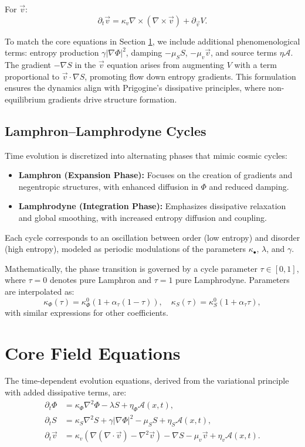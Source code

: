 \documentclass[12pt]{article}
\theoremstyle{definition}
\begin{document}
For $\vec{v}$:
\[
\partial_t \vec{v} = \kappa_v \nabla \times (\nabla \times \vec{v}) + \partial_{\vec{v}} V.
\]

To match the core equations in Section \ref{sec:core-equations}, we include additional phenomenological terms: entropy production $\gamma |\nabla \Phi|^2$, damping $-\mu_S S$, $-\mu_v \vec{v}$, and source terms $\eta \mathcal{A}$. The gradient $-\nabla S$ in the $\vec{v}$ equation arises from augmenting $V$ with a term proportional to $\vec{v} \cdot \nabla S$, promoting flow down entropy gradients. This formulation ensures the dynamics align with Prigogine's dissipative principles, where non-equilibrium gradients drive structure formation.

\subsection{Lamphron–Lamphrodyne Cycles}
Time evolution is discretized into alternating phases that mimic cosmic cycles:
\begin{itemize}
  \item \textbf{Lamphron (Expansion Phase):} Focuses on the creation of gradients and negentropic structures, with enhanced diffusion in $\Phi$ and reduced damping.
  \item \textbf{Lamphrodyne (Integration Phase):} Emphasizes dissipative relaxation and global smoothing, with increased entropy diffusion and coupling.
\end{itemize}
Each cycle corresponds to an oscillation between order (low entropy) and disorder (high entropy), modeled as periodic modulations of the parameters $\kappa_\bullet$, $\lambda$, and $\gamma$.

Mathematically, the phase transition is governed by a cycle parameter $\tau \in [0, 1]$, where $\tau = 0$ denotes pure Lamphron and $\tau = 1$ pure Lamphrodyne. Parameters are interpolated as:
\begin{equation}
\kappa_\Phi(\tau) = \kappa_\Phi^0 (1 + \alpha_\tau (1 - \tau)), \quad \kappa_S(\tau) = \kappa_S^0 (1 + \alpha_\tau \tau),
\end{equation}
with similar expressions for other coefficients.

\section{Core Field Equations}
\label{sec:core-equations}
The time-dependent evolution equations, derived from the variational principle with added dissipative terms, are:
\begin{align}
\partial_t \Phi &= \kappa_\Phi \nabla^2 \Phi - \lambda S + \eta_\Phi \mathcal{A}(x,t), \label{eq:phi-evol} \\
\partial_t S &= \kappa_S \nabla^2 S + \gamma |\nabla \Phi|^2 - \mu_S S + \eta_S \mathcal{A}(x,t), \label{eq:s-evol} \\
\partial_t \vec{v} &= \kappa_v(\nabla(\nabla \cdot \vec{v}) - \nabla^2 \vec{v}) - \nabla S - \mu_v \vec{v} + \eta_v \mathcal{A}(x,t). \label{eq:v-evol}
\end{align}
\end{document}
